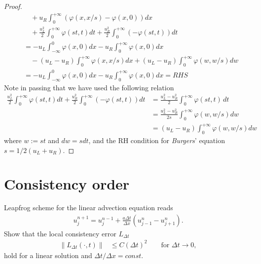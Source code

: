 \documentclass[12pt]{article}
\begin{document}
\begin{proof}
\begin{align*}
		 & \quad + u_{R}\int_{0}^{+\infty}\left(\varphi(x,x/s)-\varphi(x,0)\right) dx           \\
		 & \quad + \frac{u_{L}^2}{2}\int_{0}^{+\infty} \varphi(st,t)dt 
		+ \frac{u_{R}^2}{2}\int_{0}^{+\infty} \left(-\varphi(st,t)\right)dt                     \\
		 & = -u_{L}\int_{-\infty}^{0}\varphi(x,0)dx 
		-u_{R}\int^{+\infty}_{0}\varphi(x,0)dx                                                  \\
		 & \quad 
		- \left(u_{L}-u_{R}\right)\int_{0}^{+\infty}\varphi(x,x/s)dx
		+ \left(u_{L}-u_{R}\right)\int_{0}^{+\infty}\varphi(w,w/s)dw                            \\
		 & = -u_{L}\int_{-\infty}^{0}\varphi(x,0)dx 
		-u_{R}\int^{+\infty}_{0}\varphi(x,0)dx      
		= RHS
	\end{align*}
	Note in passing that we have used the following relation
	\begin{align*}
		\frac{u_{L}^2}{2}\int_{0}^{+\infty} \varphi(st,t)dt 
		+ \frac{u_{R}^2}{2}\int_{0}^{+\infty} \left(-\varphi(st,t)\right)dt       
		 & = \frac{u_{L}^2-u_{R}^2}{2}\int_{0}^{+\infty} \varphi(st,t)\,dt \\
		 & = \frac{u_{L}^2-u_{R}^2}{2s}\int_{0}^{+\infty}\varphi(w,w/s)dw  \\
		 & = \left(u_{L}-u_{R}\right)\int_{0}^{+\infty}\varphi(w,w/s)dw
	\end{align*}
	where $w:=st$ and $dw=sdt$, and the RH condition for \emph{Burgers}' equation $s=1/2(u_{L}+u_{R})$.
\end{proof}
\clearpage
\section{Consistency order}
\begin{example}
	Leapfrog scheme for the linear advection equation reads
	\begin{align*}
		u_j^{n+1}  = u_j^{n-1} + \frac{a \Delta t}{\Delta x} \left( u_{j-1}^n - u_{j+1}^n \right).
	\end{align*}
	Show that the local consistency error $L_{\Delta t}$
	\begin{align*}
		\|L_{\Delta t}(\cdot,t)\| & \leq C (\Delta t)^2\qquad \text{for } \Delta t \to 0,
	\end{align*}
	hold for a linear solution and $\Delta t/\Delta x=const.$
\end{example}
\end{document}
